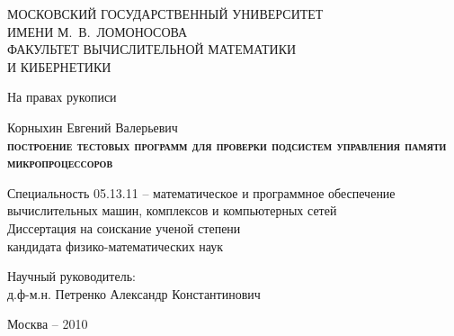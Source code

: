 \documentclass[14pt]{extreport}
\begin{document}
\thispagestyle{empty}

\begin{singlespace}
\begin{center}
%
МОСКОВСКИЙ ГОСУДАРСТВЕННЫЙ УНИВЕРСИТЕТ\\ ИМЕНИ М.~В.~ЛОМОНОСОВА\\[0.5cm]

ФАКУЛЬТЕТ ВЫЧИСЛИТЕЛЬНОЙ МАТЕМАТИКИ\\ И КИБЕРНЕТИКИ\\[1cm]
\end{center}

\begin{flushright}
На правах рукописи\\[2cm]
\end{flushright}

\begin{center}
Корныхин Евгений Валерьевич\\[1cm]
\textbf{%
\huge{%
\textsc{построение тестовых программ для проверки подсистем управления памяти микропроцессоров}}\\[0.5cm]}

Специальность 05.13.11 -- математическое и программное обеспечение вычислительных машин, комплексов и компьютерных сетей\\[1.5cm]


Диссертация на соискание ученой степени\\
кандидата физико-математических наук
\end{center}

\vspace{0.7cm}

\begin{flushright} Научный руководитель:\\
д.ф-м.н. Петренко Александр Константинович
\end{flushright}

\vspace{1.5cm}

\begin{center}
Москва -- 2010
\end{center}


\end{singlespace}
\end{document}
